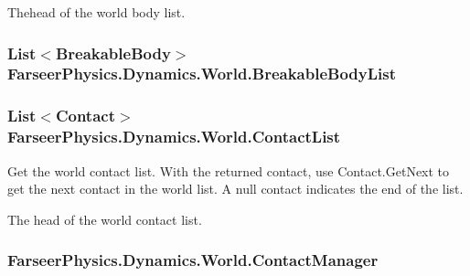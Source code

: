 Thehead of the world body list.\hypertarget{class_farseer_physics_1_1_dynamics_1_1_world_aea0e80ecc94dfc580fe748dfbbd4227b}{
\subsubsection[{Breakable\+Body\+List}]{\setlength{\rightskip}{0pt plus 5cm}List$<${\bf Breakable\+Body}$>$ Farseer\+Physics.\+Dynamics.\+World.\+Breakable\+Body\+List\hspace{0.3cm}{\ttfamily [get]}}}\label{class_farseer_physics_1_1_dynamics_1_1_world_aea0e80ecc94dfc580fe748dfbbd4227b}
\hypertarget{class_farseer_physics_1_1_dynamics_1_1_world_a10c4b997f789d459730a93f2431093d4}{
\subsubsection[{Contact\+List}]{\setlength{\rightskip}{0pt plus 5cm}List$<${\bf Contact}$>$ Farseer\+Physics.\+Dynamics.\+World.\+Contact\+List\hspace{0.3cm}{\ttfamily [get]}}}\label{class_farseer_physics_1_1_dynamics_1_1_world_a10c4b997f789d459730a93f2431093d4}


Get the world contact list. With the returned contact, use Contact.\+Get\+Next to get the next contact in the world list. A null contact indicates the end of the list. 

The head of the world contact list.\hypertarget{class_farseer_physics_1_1_dynamics_1_1_world_aee911720887213f3461704e10a2ec5cd}{
\subsubsection[{Contact\+Manager}]{ Farseer\+Physics.\+Dynamics.\+World.\+Contact\+Manager\hspace{0.3cm}{\ttfamily [get]}}}\label{class_farseer_physics_1_1_dynamics_1_1_world_aee911720887213f3461704e10a2ec5cd}


